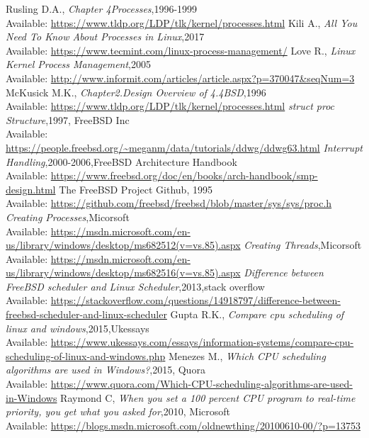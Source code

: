 \documentclass[onecolumn, draftclsnofoot,10pt, compsoc]{IEEEtran}
\begin{document}
\begin{thebibliography}{14}
\bibitem{}
Rusling D.A., \textit{Chapter 4Processes},1996-1999 \\
Available: \url{https://www.tldp.org/LDP/tlk/kernel/processes.html}
\bibitem{}
Kili A., \textit{All You Need To Know About Processes in Linux},2017 \\
Available: \url{https://www.tecmint.com/linux-process-management/}
\bibitem{}
Love R., \textit{Linux Kernel Process Management},2005 \\
Available: \url{http://www.informit.com/articles/article.aspx?p=370047&seqNum=3}
\bibitem{}
McKusick M.K., \textit{Chapter2.Design Overview of 4.4BSD},1996 \\
Available: \url{https://www.tldp.org/LDP/tlk/kernel/processes.html}
\bibitem{}
\textit{struct proc Structure},1997, FreeBSD Inc \\
Available: \url{https://people.freebsd.org/~meganm/data/tutorials/ddwg/ddwg63.html}
\bibitem{}
\textit{Interrupt Handling},2000-2006,FreeBSD Architecture Handbook \\
Available: \url{https://www.freebsd.org/doc/en/books/arch-handbook/smp-design.html}
\bibitem{}
The FreeBSD Project Github, 1995 \\
Available: \url{https://github.com/freebsd/freebsd/blob/master/sys/sys/proc.h}
\bibitem{}
\textit{Creating Processes},Micorsoft\\
Available: \url{https://msdn.microsoft.com/en-us/library/windows/desktop/ms682512(v=vs.85).aspx}
\bibitem{}
\textit{Creating Threads},Micorsoft \\
Available: \url{https://msdn.microsoft.com/en-us/library/windows/desktop/ms682516(v=vs.85).aspx}
\bibitem{}
\textit{Difference between FreeBSD scheduler and Linux Scheduler},2013,stack overflow \\
Available: \url{https://stackoverflow.com/questions/14918797/difference-between-freebsd-scheduler-and-linux-scheduler}
\bibitem{}
Gupta R.K., \textit{Compare cpu scheduling of linux and windows},2015,Ukessays \\
Available: \url{https://www.ukessays.com/essays/information-systems/compare-cpu-scheduling-of-linux-and-windows.php}
\bibitem{}
Menezes M., \textit{Which CPU scheduling algorithms are used in Windows?},2015, Quora \\
Available: \url{https://www.quora.com/Which-CPU-scheduling-algorithms-are-used-in-Windows}
\bibitem{}
Raymond C, \textit{When you set a 100 percent CPU program to real-time priority, you get what you asked for},2010, Microsoft \\
Available: \url{https://blogs.msdn.microsoft.com/oldnewthing/20100610-00/?p=13753}
\end{thebibliography}
\end{document}
